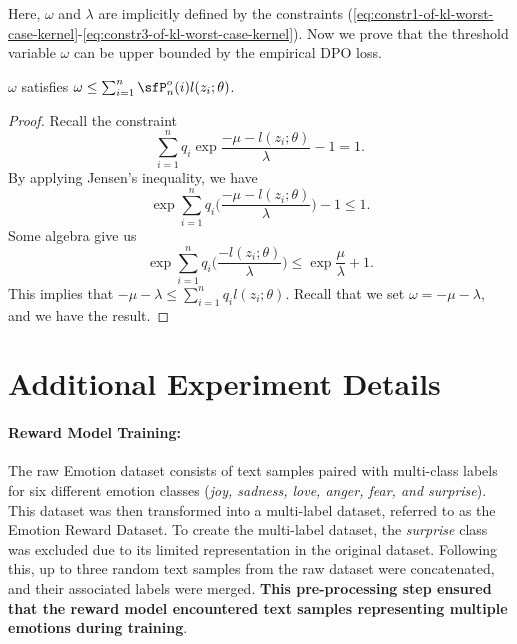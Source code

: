 Here, $\omega$ and $\lambda$ are implicitly defined by the constraints (\cref{eq:constr1-of-kl-worst-case-kernel}-\cref{eq:constr3-of-kl-worst-case-kernel}). Now we prove that the threshold variable $\omega$ can be upper bounded by the empirical DPO loss.
\begin{proposition}\label{prop:bound-on-dual-var}
    $\omega$ satisfies $\omega \leq \sum_{i=1}^n \sfP_n^o(i) l(z_i;\theta)$.
\end{proposition}
\begin{proof}
    Recall the constraint
    \begin{equation*}
        \sum_{i=1}^n q_i \exp{\frac{-\mu-l(z_i;\theta)}{\lambda}-1} = 1.
    \end{equation*}
    By applying Jensen's inequality, we have
    \begin{equation*}
        \exp{\sum_{i=1}^n q_i \bigg(\frac{-\mu-l(z_i;\theta)}{\lambda} \bigg) - 1} \leq 1.
    \end{equation*}
    Some algebra give us
    \begin{equation*}
        \exp{\sum_{i=1}^n q_i \bigg( \frac{-l(z_i;\theta)}{\lambda}\bigg)} \leq \exp{\frac{\mu}{\lambda} + 1}.
    \end{equation*}
    This implies  that $-\mu-\lambda \leq \sum_{i=1}^n q_i l(z_i;\theta)$. Recall that we set $\omega = -\mu-\lambda$, and we have the result.
\end{proof}






\section{Additional Experiment Details}\label{sec:emotion-alignment-appendix}
\paragraph{Reward Model Training:} 
The raw Emotion dataset \citep{saravia-etal-2018-carer} consists of text samples paired with multi-class labels for six different emotion classes (\textit{joy, sadness, love, anger, fear, and surprise}). This dataset was then transformed into a multi-label dataset, referred to as the Emotion Reward Dataset. To create the multi-label dataset, the \textit{surprise} class was excluded due to its limited representation in the original dataset. Following this, up to three random text samples from the raw dataset were concatenated, and their associated labels were merged. \textbf{This pre-processing step ensured that the reward model encountered text samples representing multiple emotions during training}. 

